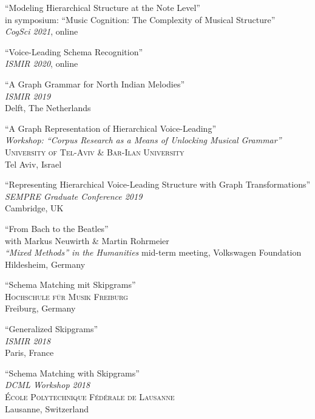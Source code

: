 \documentclass[10pt]{scrartcl}
\newcommand{\margintext}[1]{\marginpar{\raggedleft\itshape\small#1}}
\newcommand{\entry}[1]{\vphantom{x}\margintext{#1}}
\begin{document}
\contrib \enquote{Modeling Hierarchical Structure at the Note Level}
\\
in symposium: \enquote{Music Cognition: The Complexity of Musical Structure}\\
\textit{CogSci 2021}, online

\entry{2020}%
\contrib \poster \enquote{Voice-Leading Schema Recognition}
\\
\textit{ISMIR 2020}, online

\entry{2019}%
\contrib \poster \enquote{A Graph Grammar for North Indian Melodies}
\\
\textit{ISMIR 2019}\\
Delft, The Netherlands

\invited \enquote{A Graph Representation of Hierarchical Voice-Leading}
\\
\textit{Workshop: \enquote{Corpus Research as a Means of Unlocking Musical Grammar}}\\
\textsc{University of Tel-Aviv \& Bar-Ilan University}\\
Tel Aviv, Israel

\poster \enquote{Representing Hierarchical Voice-Leading Structure with Graph Transformations}\\
\textit{SEMPRE Graduate Conference 2019}\\
Cambridge, UK

\contrib \enquote{From Bach to the Beatles}
\\
with Markus Neuwirth \& Martin Rohrmeier\\
\textit{\enquote{Mixed Methods} in the Humanities} mid-term meeting, Volkswagen Foundation\\
Hildesheim, Germany

\invited \enquote{Schema Matching mit Skipgrams}
\\
\textsc{Hochschule für Musik Freiburg}\\
Freiburg, Germany

\entry{2018}%
\contrib \poster \enquote{Generalized Skipgrams}
\\
\textit{ISMIR 2018}\\
Paris, France

\invited \enquote{Schema Matching with Skipgrams}
\\
\textit{DCML Workshop 2018}\\
\textsc{École Polytechnique Fédérale de Lausanne}\\
Lausanne, Switzerland
\end{document}
